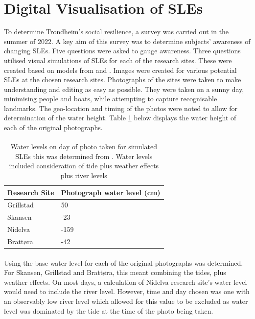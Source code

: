 \section{Digital Visualisation of SLEs}
To determine Trondheim's social resilience, a survey was carried out in the summer of 2022. A key aim of this survey was to determine subjects' awareness of changing SLEs.  Five questions were asked to gauge awareness. Three questions utilised visual simulations of SLEs for each of the research sites. These were created based on models from \cite{dsb_integrating-sea-level-rise-and-storm-surges--local-planningpdf_2017} and \cite{kartverket_se_2020}. Images were created for various potential SLEs at the chosen research sites. Photographs of the sites were taken to make understanding and editing as easy as possible. They were taken on a sunny day, minimising people and boats, while attempting to capture recognisable landmarks. The geo-location and timing of the photos were noted to allow for determination of the water height. Table \ref{tab:water_level_photo} below displays the water height of each of the original photographs. 
\paragraph{}

\begin{table}[H]
    \centering
    \begin{tabular}{|l|l|}
        \hline
     	\textbf{Research Site} & \textbf{Photograph water level (cm)} \\ \hline
            Grillstad & 50 \\ \hline
            Skansen & -23 \\ \hline
            Nidelva & -159 \\ \hline
            Brattøra	& -42 \\ \hline
    \end{tabular}
    \caption{Water levels on day of photo taken for simulated SLEs this was determined from \cite{tides_high_2022}. Water levels included consideration of tide plus weather effects plus river levels}
    \label{tab:water_level_photo}
\end{table}
\paragraph{}

Using \cite{tides_high_2022} the base water level for each of the original photographs was determined. For Skansen, Grillstad and Brattøra, this meant combining the tides, plus weather effects. On most days, a calculation of Nidelva research site's water level would need to include the river level. However, time and day chosen was one with an observably low river level which allowed for this value to be excluded as water level was dominated by the tide at the time of the photo being taken.   
